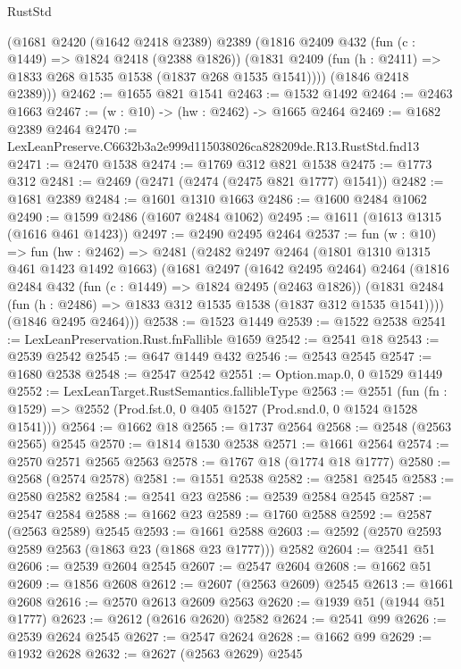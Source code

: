 \begin{lexlean}{RustStd}
\begin{coremodule}
      (@1681
        @2420
        (@1642 @2418 @2389)
        @2389
        (@1816
          @2409
          @432
          (fun (c : @1449) => @1824 @2418 (@2388 @1826))
          (@1831 @2409 (fun (h : @2411) => @1833 @268 @1535 @1538 (@1837 @268 @1535 @1541))))
        (@1846 @2418 @2389)))
@2462 := @1655 @821 @1541
@2463 := @1532 @1492
@2464 := @2463 @1663
@2467 := (w : @10) -> (hw : @2462) -> @1665 @2464
@2469 := @1682 @2389 @2464
@2470 := LexLeanPreserve.C6632b3a2e999d115038026ca828209de.R13.RustStd.fnd13
@2471 := @2470 @1538
@2474 := @1769 @312 @821 @1538
@2475 := @1773 @312
@2481 := @2469 (@2471 (@2474 (@2475 @821 @1777) @1541))
@2482 := @1681 @2389
@2484 := @1601 @1310 @1663
@2486 := @1600 @2484 @1062
@2490 := @1599 @2486 (@1607 @2484 @1062)
@2495 := @1611 (@1613 @1315 (@1616 @461 @1423))
@2497 := @2490 @2495 @2464
@2537 := fun (w : @10) =>
  fun (hw : @2462) =>
  @2481
    (@2482
      @2497
      @2464
      (@1801 @1310 @1315 @461 @1423 @1492 @1663)
      (@1681
        @2497
        (@1642 @2495 @2464)
        @2464
        (@1816
          @2484
          @432
          (fun (c : @1449) => @1824 @2495 (@2463 @1826))
          (@1831 @2484 (fun (h : @2486) => @1833 @312 @1535 @1538 (@1837 @312 @1535 @1541))))
        (@1846 @2495 @2464)))
@2538 := @1523 @1449
@2539 := @1522 @2538
@2541 := LexLeanPreservation.Rust.fnFallible @1659
@2542 := @2541 @18
@2543 := @2539 @2542
@2545 := @647 @1449 @432
@2546 := @2543 @2545
@2547 := @1680 @2538
@2548 := @2547 @2542
@2551 := Option.map.{0, 0} @1529 @1449
@2552 := LexLeanTarget.RustSemantics.fallibleType
@2563 := @2551
    (fun (fn : @1529) => @2552 (Prod.fst.{0, 0} @405 @1527 (Prod.snd.{0, 0} @1524 @1528 @1541)))
@2564 := @1662 @18
@2565 := @1737 @2564
@2568 := @2548 (@2563 @2565) @2545
@2570 := @1814 @1530 @2538
@2571 := @1661 @2564
@2574 := @2570 @2571 @2565 @2563
@2578 := @1767 @18 (@1774 @18 @1777)
@2580 := @2568 (@2574 @2578)
@2581 := @1551 @2538
@2582 := @2581 @2545
@2583 := @2580 @2582
@2584 := @2541 @23
@2586 := @2539 @2584 @2545
@2587 := @2547 @2584
@2588 := @1662 @23
@2589 := @1760 @2588
@2592 := @2587 (@2563 @2589) @2545
@2593 := @1661 @2588
@2603 := @2592 (@2570 @2593 @2589 @2563 (@1863 @23 (@1868 @23 @1777))) @2582
@2604 := @2541 @51
@2606 := @2539 @2604 @2545
@2607 := @2547 @2604
@2608 := @1662 @51
@2609 := @1856 @2608
@2612 := @2607 (@2563 @2609) @2545
@2613 := @1661 @2608
@2616 := @2570 @2613 @2609 @2563
@2620 := @1939 @51 (@1944 @51 @1777)
@2623 := @2612 (@2616 @2620) @2582
@2624 := @2541 @99
@2626 := @2539 @2624 @2545
@2627 := @2547 @2624
@2628 := @1662 @99
@2629 := @1932 @2628
@2632 := @2627 (@2563 @2629) @2545

\end{coremodule}
\end{lexlean}
